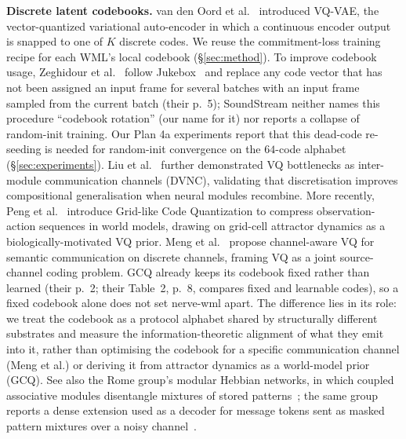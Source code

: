 \documentclass[10pt,twocolumn]{article}
\begin{document}
\textbf{Discrete latent codebooks.} van den Oord et al.~\cite{vandenoord2017neural} introduced VQ-VAE, the vector-quantized variational auto-encoder in which a continuous encoder output is snapped to one of $K$ discrete codes. We reuse the commitment-loss training recipe for each WML's local codebook (\S\ref{sec:method}). To improve codebook usage, Zeghidour et al.~\cite{zeghidour2022soundstream} follow Jukebox~\cite{dhariwal2020jukebox} and replace any code vector that has not been assigned an input frame for several batches with an input frame sampled from the current batch (their p.~5); SoundStream neither names this procedure ``codebook rotation'' (our name for it) nor reports a collapse of random-init training. Our Plan 4a experiments report that this dead-code re-seeding is needed for random-init convergence on the $64$-code alphabet (\S\ref{sec:experiments}). Liu et al.~\cite{liu2021dvnc} further demonstrated VQ bottlenecks as inter-module communication channels (DVNC), validating that discretisation improves compositional generalisation when neural modules recombine. More recently, Peng et al.~\cite{peng2025gridlikevq} introduce Grid-like Code Quantization to compress observation-action sequences in world models, drawing on grid-cell attractor dynamics as a biologically-motivated VQ prior. Meng et al.~\cite{meng2025channelawarevq} propose channel-aware VQ for semantic communication on discrete channels, framing VQ as a joint source-channel coding problem. GCQ already keeps its codebook fixed rather than learned (their p.~2; their Table~2, p.~8, compares fixed and learnable codes), so a fixed codebook alone does not set nerve-wml apart. The difference lies in its role: we treat the codebook as a protocol alphabet shared by structurally different substrates and measure the information-theoretic alignment of what they emit into it, rather than optimising the codebook for a specific communication channel (Meng et al.) or deriving it from attractor dynamics as a world-model prior (GCQ). See also the Rome group's modular Hebbian networks, in which coupled associative modules disentangle mixtures of stored patterns~\cite{agliari2026networks,agliari2025ldirectional}; the same group reports a dense extension used as a decoder for message tokens sent as masked pattern mixtures over a noisy channel~\cite{agliari2026dense}.
\end{document}
